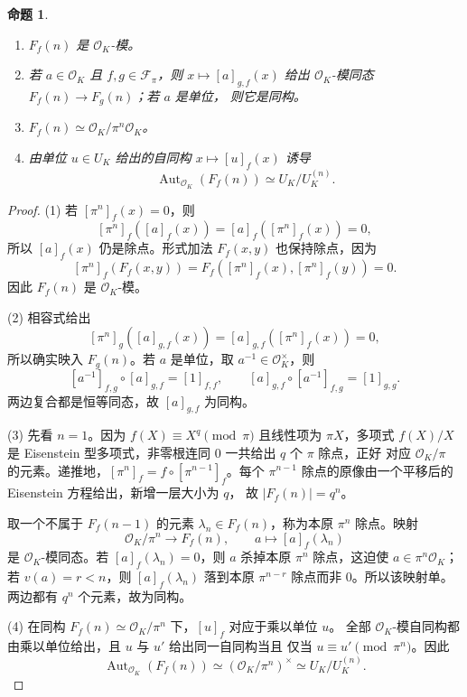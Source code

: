 \documentclass[11pt,a4paper,openany]{ctexbook}
\numberwithin{equation}{chapter}
\theoremstyle{plain}
\newtheorem{proposition}[theorem]{命题}
\theoremstyle{definition}
\theoremstyle{remark}
\begin{document}
\begin{proposition}
\begin{enumerate}[label=(\arabic*)]
\item $F_f(n)$ 是 $\mathcal O_K$-模。
\item 若 $a\in\mathcal O_K$ 且 $f,g\in\mathcal F_\pi$，则
$x\mapsto[a]_{g,f}(x)$ 给出 $\mathcal O_K$-模同态 $F_f(n)\to F_g(n)$；若 $a$ 是单位，
则它是同构。
\item $F_f(n)\simeq\mathcal O_K/\pi^n\mathcal O_K$。
\item 由单位 $u\in U_K$ 给出的自同构 $x\mapsto[u]_f(x)$ 诱导
\[
\operatorname{Aut}_{\mathcal O_K}(F_f(n))\simeq U_K/U_K^{(n)}.
\]
\end{enumerate}
\end{proposition}

\begin{proof}
(1) 若 $[\pi^n]_f(x)=0$，则
\[
[\pi^n]_f([a]_f(x))=[a]_f([\pi^n]_f(x))=0,
\]
所以 $[a]_f(x)$ 仍是除点。形式加法 $F_f(x,y)$ 也保持除点，因为
\[
[\pi^n]_f(F_f(x,y))=F_f([\pi^n]_f(x),[\pi^n]_f(y))=0.
\]
因此 $F_f(n)$ 是
$\mathcal O_K$-模。

(2) 相容式给出
\[
[\pi^n]_g([a]_{g,f}(x))=[a]_{g,f}([\pi^n]_f(x))=0,
\]
所以确实映入 $F_g(n)$。若 $a$ 是单位，取 $a^{-1}\in\mathcal O_K^\times$，则
\[
[a^{-1}]_{f,g}\circ[a]_{g,f}=[1]_{f,f},\qquad
[a]_{g,f}\circ[a^{-1}]_{f,g}=[1]_{g,g}.
\]
两边复合都是恒等同态，故 $[a]_{g,f}$ 为同构。

(3) 先看 $n=1$。因为 $f(X)\equiv X^q\pmod\pi$ 且线性项为 $\pi X$，多项式
$f(X)/X$ 是 Eisenstein 型多项式，非零根连同 $0$ 一共给出 $q$ 个 $\pi$ 除点，正好
对应 $\mathcal O_K/\pi$ 的元素。递推地，$[\pi^n]_f=f\circ[\pi^{n-1}]_f$。每个
$\pi^{n-1}$ 除点的原像由一个平移后的 Eisenstein 方程给出，新增一层大小为 $q$，
故 $|F_f(n)|=q^n$。

取一个不属于 $F_f(n-1)$ 的元素 $\lambda_n\in F_f(n)$，称为本原 $\pi^n$ 除点。映射
\[
\mathcal O_K/\pi^n\to F_f(n),\qquad
a\mapsto [a]_f(\lambda_n)
\]
是 $\mathcal O_K$-模同态。若 $[a]_f(\lambda_n)=0$，则 $a$ 杀掉本原
$\pi^n$ 除点，这迫使 $a\in\pi^n\mathcal O_K$；若 $v(a)=r<n$，则
$[a]_f(\lambda_n)$ 落到本原 $\pi^{n-r}$ 除点而非 $0$。所以该映射单。两边都有
$q^n$ 个元素，故为同构。

(4) 在同构 $F_f(n)\simeq\mathcal O_K/\pi^n$ 下，$[u]_f$ 对应于乘以单位 $u$。
全部 $\mathcal O_K$-模自同构都由乘以单位给出，且 $u$ 与 $u'$ 给出同一自同构当且
仅当 $u\equiv u'\pmod{\pi^n}$。因此
\[
\operatorname{Aut}_{\mathcal O_K}(F_f(n))\simeq
(\mathcal O_K/\pi^n)^\times\simeq U_K/U_K^{(n)}.
\]
\end{proof}
\end{document}

